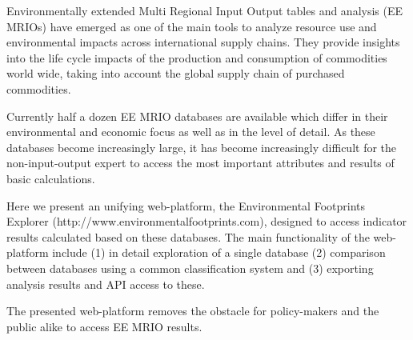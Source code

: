 Environmentally extended Multi Regional Input Output tables and analysis (EE MRIOs) have emerged as one of the main tools to analyze resource use and environmental impacts across international supply chains. They provide insights into the life cycle impacts of the production and consumption of commodities world wide, taking into account the global supply chain of purchased commodities.

Currently half a dozen EE MRIO databases are available which differ in their environmental and economic focus as well as in the level of detail. As these databases become increasingly large, it has become increasingly difficult for the non-input-output expert to access the most important attributes and results of basic calculations.

Here we present an unifying web-platform, the Environmental Footprints Explorer (http://www.environmentalfootprints.com), designed to access indicator results calculated based on these databases. The main functionality of the web-platform include (1) in detail exploration of a single database (2) comparison between databases using a common classification system and (3) exporting analysis results and API access to these.

The presented web-platform removes the obstacle for policy-makers and the public alike to access EE MRIO results. 

